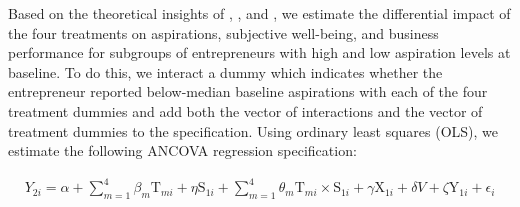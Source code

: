 \documentclass[11.5pt]{article}
\begin{document}


Based on the theoretical insights of \citet{Ray2006}, \citet{Genicot2017}, and \citet{Dalton2016}, we estimate the differential impact of the four treatments on aspirations, subjective well-being, and business performance for subgroups of entrepreneurs with high and low aspiration levels at baseline. To do this, we interact a dummy which indicates whether the entrepreneur reported below-median baseline aspirations with each of the four treatment dummies and add both the vector of interactions and the vector of treatment dummies to the specification. Using ordinary least squares (OLS), we estimate the following ANCOVA regression specification:

\begin{align}
    {Y}_{2i} = \alpha + \sum\limits_{m=1}^4 \beta_m \text{T}_{mi} + \eta \text{S}_{1i} + \sum\limits_{m=1}^4 \theta_m \text{T}_{mi} \times \text{S}_{1i} + \gamma \text{X}_{1i} + \delta {V} + \zeta \text{Y}_{1i} + \epsilon_i \label{eq:1}
\end{align}
\end{document}

